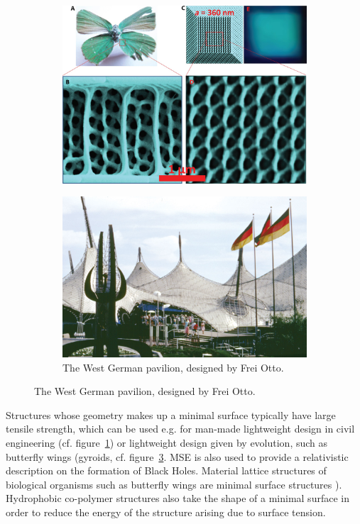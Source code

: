 \documentclass[11pt]{scrartcl}
\begin{document}
\begin{figure}
	\vspace{-40pt}
	\centering
	\begin{subfigure}{.4\linewidth}
	\centering	
		\includegraphics[width=\linewidth]{./figs/BioGyroid.jpg}
		\caption{\scriptsize \cite[Gyroid minimal surface]{gan_biomimetic_2016}}\label{fig:111}
	\end{subfigure}
\hfill
	\begin{subfigure}{.4\linewidth}
	\centering
		\includegraphics[width=\linewidth]{./figs/Architecture.jpg}
		\caption{\scriptsize The West German pavilion, designed by Frei Otto.\cite{noauthor_frei_nodate}}\label{fig:222}
	\end{subfigure}
\end{figure}
Structures whose geometry makes up a minimal surface typically have large tensile strength, which can be used e.g. for man-made lightweight design in civil engineering (cf. figure~\ref{fig:111}) or lightweight design given by evolution, such as butterfly wings (gyroids, cf. figure~\ref{fig:222}. MSE is also used to provide a relativistic description on the formation of Black Holes. Material lattice structures of biological organisms such as butterfly wings are minimal surface structures ). Hydrophobic co-polymer structures also take the shape of a minimal surface in order to reduce the energy of the structure arising due to surface tension. \cite{gan_biomimetic_2016, wiki:minsurf}
\end{document}
